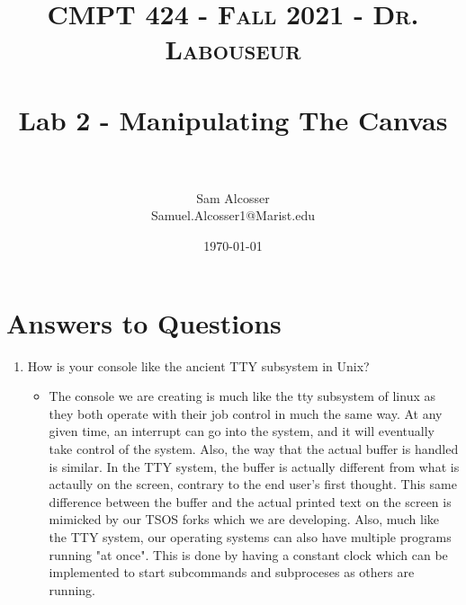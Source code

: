 \documentclass[letterpaper, 10pt]{article}
\title{	
   \normalfont \normalsize 
   \textsc{CMPT 424 - Fall 2021 - Dr. Labouseur} \\[10pt] %
   \horrule{0.5pt} \\[0.25cm] 	%
   \huge Lab 2 - Manipulating The Canvas \\     	    %
   \horrule{0.5pt} \\[0.25cm] 	%
}
\author{Sam Alcosser \\ \normalsize Samuel.Alcosser1@Marist.edu}
\date{\normalsize\today} 	%
\begin{document}
\maketitle %



\section{Answers to Questions}
\begin{enumerate}
     \item How is your console like the ancient TTY subsystem in Unix?
        \begin{itemize}
            \item The console we are creating is much like the tty subsystem of linux as they both operate with their job control in much the same way. At any given time, an interrupt can go into the system, and it will eventually take control of the system. Also, the way that the actual buffer is handled is similar. In the TTY system, the buffer is actually different from what is actaully on the screen, contrary to the end user's first thought. This same difference between the buffer and the actual printed text on the screen is mimicked by our TSOS forks which we are developing. Also, much like the TTY system, our operating systems can also have multiple programs running "at once". This is done by having a constant clock which can be implemented to start subcommands and subproceses as others are running.
        \end{itemize}

\end{enumerate}
\end{document}
